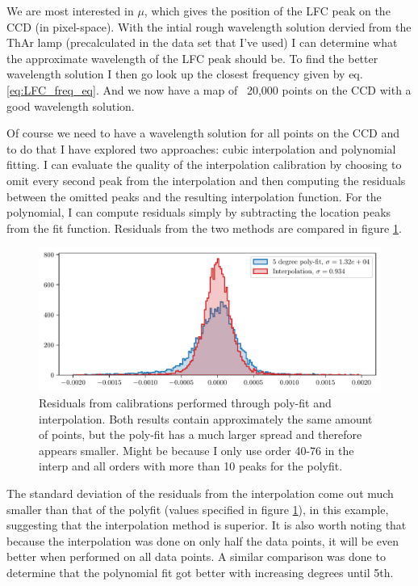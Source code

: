     We are most interested in $\mu$, which gives the position of the LFC peak on the CCD (in pixel-space). With the intial rough wavelength solution dervied from the ThAr lamp (precalculated in the data set that I've used) I can determine what the approximate wavelength of the LFC peak should be. To find the better wavelength solution I then go look up the closest frequency given by eq. \ref{eq:LFC_freq_eq}. And we now have a map of ~20,000 points on the CCD with a good wavelength solution. 
    
    Of course we need to have a wavelength solution for all points on the CCD and to do that I have explored two approaches: cubic interpolation and polynomial fitting.  I can evaluate the quality of the interpolation calibration by choosing to omit every second peak from the interpolation and then computing the residuals between the omitted peaks and the resulting interpolation function. For the polynomial, I can compute residuals simply by subtracting the location peaks from the fit function. Residuals from the two methods are compared in figure \ref{fig:calib_poly_vs_interp}.

    \begin{figure}[ht]
        \centering
        \includegraphics[scale=0.80]{figures/hist_peak_residuals_poly_and_interp.pdf}
        \caption{Residuals from calibrations performed through poly-fit and interpolation. Both results contain approximately the same amount of points, but the poly-fit has a much larger spread and therefore appears smaller.  Might be because I only use order 40-76 in the interp and all orders with more than 10 peaks for the polyfit.  }
        \label{fig:calib_poly_vs_interp}
    \end{figure}

    The standard deviation of the residuals from the interpolation come out much smaller than that of the polyfit (values specified in figure \ref{fig:calib_poly_vs_interp}), in this example, suggesting that the interpolation method is superior. It is also worth noting that because the interpolation was done on only half the data points, it will be even better when performed on all data points. A similar comparison was done to determine that the polynomial fit got better with increasing degrees until 5th. 


